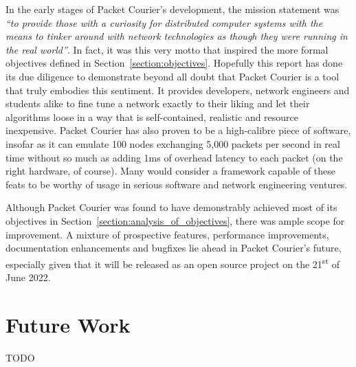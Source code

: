 In the early stages of Packet Courier's development, the mission statement was \emph{``to provide those with a
curiosity for distributed computer systems with the means to tinker around with network technologies as though they
were running in the real world''}. In fact, it was this very motto that inspired the more formal objectives defined
in Section~\ref{section:objectives}. Hopefully this report has done its due diligence to demonstrate beyond all doubt
that Packet Courier is a tool that truly embodies this sentiment. It provides developers, network engineers and
students alike to fine tune a network exactly to their liking and let their algorithms loose in a way that is
self-contained, realistic and resource inexpensive. Packet Courier has also proven to be a high-calibre piece of
software, insofar as it can emulate 100 nodes exchanging 5,000 packets per second in real time without so much as
adding 1ms of overhead latency to each packet (on the right hardware, of course). Many would consider a framework
capable of these feats to be worthy of usage in serious software and network engineering ventures.

Although Packet Courier was found to have demonstrably achieved most of its objectives in
Section~\ref{section:analysis_of_objectives}, there was ample scope for improvement. A mixture of prospective
features, performance improvements, documentation enhancements and bugfixes lie ahead in Packet Courier's future,
especially given that it will be released as an open source project on the 21\textsuperscript{st} of June 2022.


\section{Future Work}\label{section:future_work}

TODO
